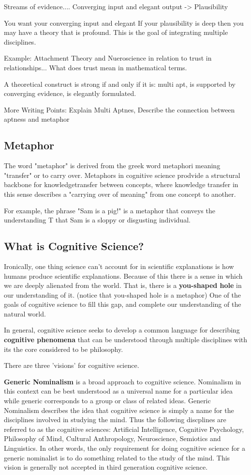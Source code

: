 \documentclass[twoside]{article}
\begin{document}
Streams of evidence....
Converging input and elegant output -> Plausibility

You want your converging input and elegant
If your plausibility is deep then you may have a theory that is profound. This is
the goal of integrating multiple disciplines.

Example: Attachment Theory and Nueroscience in relation to trust in relationships...
What does trust mean in mathematical terms.

A theoretical construct is strong if and only if it is: multi apt, is supported by converging evidence, is
elegantly formulated.

More Writing Points: Explain Multi Aptnes, Describe the connection between aptness
and metaphor

\subsection{Metaphor}
The word "metaphor" is derived from the greek word metaphori meaning "transfer"
or to carry over. Metaphors in cognitive science prodvide a structural backbone
for knowledgetransfer between concepts, where knowledge transfer in this sense
describes a "carrying over of meaning" from one concept to another.

For example, the phrase "Sam is a pig!" is a metaphor that conveys the understanding T
that Sam is a sloppy or disgusting individual.


\subsection{What is Cognitive Science?}
Ironically, one thing science can't account for in scientific explanations is how
humans produce scientific explanations. Because of this there is a sense in which we are deeply
alienated from the world. That is, there is a \textbf{you-shaped hole} in
our understanding of it. (notice that you-shaped hole is a metaphor) One of the goals
of cognitive science to fill this gap, and complete our understanding of the natural world.

In general, cognitive science seeks to develop a common language for describing \textbf{cognitive phenomena}
that can be understood through multiple disciplines with its the core considered to be philosophy.

There are three 'visions' for cognitive science.

\textbf{Generic Nominalism} is a broad approach to cognitive science. Nominalism
in this context can be best understood as a universal name for a particular idea while
generic corresponds to a group or class of related ideas. Generic Nominalism
describes the idea that cognitive science is simply a name for the disciplines
involved in studying the mind. Thus the following discplines are referred to
as the cognitive sciences: Artificial Intelligence, Cognitive Psychology, Philosophy
of Mind, Cultural Anthropology, Neuroscience, Semiotics and Linguistics. In other words,
the only requirement for doing cognitive science for a generic nominalist is to
do something related to the study of the mind. This vision is generally not accepted
in third generation cognitive science.
\end{document}
